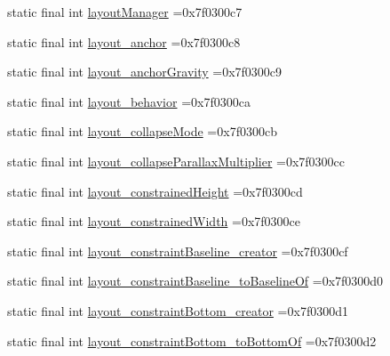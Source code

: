 \begin{DoxyCompactItemize}
\item 
static final int \mbox{\hyperlink{classcom_1_1example_1_1trainawearapplication_1_1_r_1_1attr_a3f8a3543713dc5f7f2fd48eb631c17e2}{layout\+Manager}} =0x7f0300c7
\item 
static final int \mbox{\hyperlink{classcom_1_1example_1_1trainawearapplication_1_1_r_1_1attr_a52aba3a039091c72373d231f514108e2}{layout\+\_\+anchor}} =0x7f0300c8
\item 
static final int \mbox{\hyperlink{classcom_1_1example_1_1trainawearapplication_1_1_r_1_1attr_aff49a8f88c1b16bf8a08952306119171}{layout\+\_\+anchor\+Gravity}} =0x7f0300c9
\item 
static final int \mbox{\hyperlink{classcom_1_1example_1_1trainawearapplication_1_1_r_1_1attr_a768d9ba6ea8dd10d510855a2d1ad8331}{layout\+\_\+behavior}} =0x7f0300ca
\item 
static final int \mbox{\hyperlink{classcom_1_1example_1_1trainawearapplication_1_1_r_1_1attr_a711b11ae618c0b1de554383091ffa288}{layout\+\_\+collapse\+Mode}} =0x7f0300cb
\item 
static final int \mbox{\hyperlink{classcom_1_1example_1_1trainawearapplication_1_1_r_1_1attr_a5ae8f525759549ab546340f428e83168}{layout\+\_\+collapse\+Parallax\+Multiplier}} =0x7f0300cc
\item 
static final int \mbox{\hyperlink{classcom_1_1example_1_1trainawearapplication_1_1_r_1_1attr_af808d0f61b195c1d5db0322a9ae516ec}{layout\+\_\+constrained\+Height}} =0x7f0300cd
\item 
static final int \mbox{\hyperlink{classcom_1_1example_1_1trainawearapplication_1_1_r_1_1attr_ad18f6105d5a1422f58cc83457ce0d689}{layout\+\_\+constrained\+Width}} =0x7f0300ce
\item 
static final int \mbox{\hyperlink{classcom_1_1example_1_1trainawearapplication_1_1_r_1_1attr_ad1a31094ec507602f16238f092f0375b}{layout\+\_\+constraint\+Baseline\+\_\+creator}} =0x7f0300cf
\item 
static final int \mbox{\hyperlink{classcom_1_1example_1_1trainawearapplication_1_1_r_1_1attr_a85b873b5a37b47ad19a9f2126b5cc0f6}{layout\+\_\+constraint\+Baseline\+\_\+to\+Baseline\+Of}} =0x7f0300d0
\item 
static final int \mbox{\hyperlink{classcom_1_1example_1_1trainawearapplication_1_1_r_1_1attr_afb806df9fd600be2881204f4ab00a738}{layout\+\_\+constraint\+Bottom\+\_\+creator}} =0x7f0300d1
\item 
static final int \mbox{\hyperlink{classcom_1_1example_1_1trainawearapplication_1_1_r_1_1attr_a29b03d28b0999b2dfa6c564767b0dd70}{layout\+\_\+constraint\+Bottom\+\_\+to\+Bottom\+Of}} =0x7f0300d2

\end{DoxyCompactItemize}
